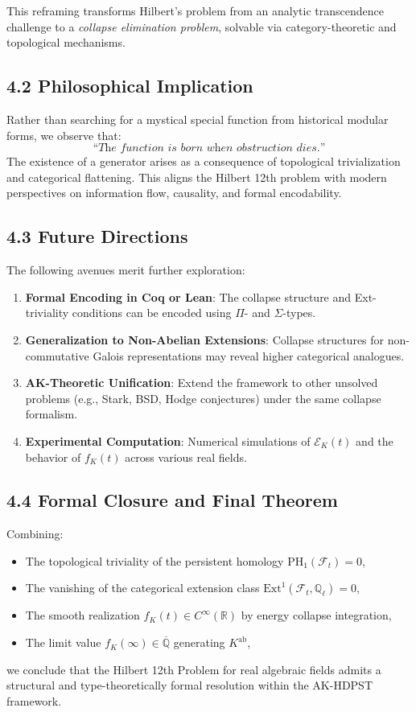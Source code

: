 \documentclass[11pt]{article}
\begin{document}
This reframing transforms Hilbert’s problem from an analytic transcendence challenge to a \emph{collapse elimination problem}, solvable via category-theoretic and topological mechanisms.

\subsection*{4.2 Philosophical Implication}

Rather than searching for a mystical special function from historical modular forms, we observe that:
\[
\textit{“The function is born when obstruction dies.”}
\]
The existence of a generator arises as a consequence of topological trivialization and categorical flattening.  
This aligns the Hilbert 12th problem with modern perspectives on information flow, causality, and formal encodability.

\subsection*{4.3 Future Directions}

The following avenues merit further exploration:
\begin{enumerate}
    \item \textbf{Formal Encoding in Coq or Lean}: The collapse structure and Ext-triviality conditions can be encoded using \( \Pi \)- and \( \Sigma \)-types.
    \item \textbf{Generalization to Non-Abelian Extensions}: Collapse structures for non-commutative Galois representations may reveal higher categorical analogues.
    \item \textbf{AK-Theoretic Unification}: Extend the framework to other unsolved problems (e.g., Stark, BSD, Hodge conjectures) under the same collapse formalism.
    \item \textbf{Experimental Computation}: Numerical simulations of \( \mathcal{E}_K(t) \) and the behavior of \( f_K(t) \) across various real fields.
\end{enumerate}

\subsection*{4.4 Formal Closure and Final Theorem}

Combining:
\begin{itemize}
    \item The topological triviality of the persistent homology \( \mathrm{PH}_1(\mathcal{F}_t) = 0 \),
    \item The vanishing of the categorical extension class \( \mathrm{Ext}^1(\mathcal{F}_t, \mathbb{Q}_\ell) = 0 \),
    \item The smooth realization \( f_K(t) \in C^\infty(\mathbb{R}) \) by energy collapse integration,
    \item The limit value \( f_K(\infty) \in \overline{\mathbb{Q}} \) generating \( K^{\mathrm{ab}} \),
\end{itemize}
we conclude that the Hilbert 12th Problem for real algebraic fields admits a structural and type-theoretically formal resolution within the AK-HDPST framework.
\end{document}
